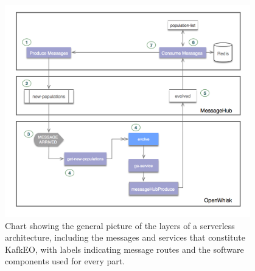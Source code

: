 \documentclass{llncs}
\begin{document}
  \begin{figure}[t!bp]
  \includegraphics[width=0.95\textwidth]{img/kafka.png}
  \caption{Chart showing the general picture of the layers of a
    serverless architecture, including the messages and services that
    constitute KafkEO, with labels indicating message
    routes and the software components used for every part.}
  \label{fig:kafkeo}
  \end{figure}
\end{document}
